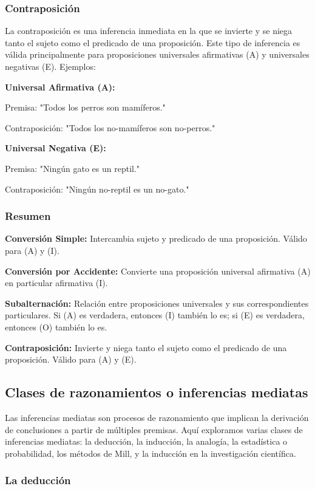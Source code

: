 \subsubsection{Contraposición}
La contraposición es una inferencia inmediata en la que se invierte y se niega tanto el sujeto como el predicado de una proposición. Este tipo de inferencia es válida principalmente para proposiciones universales afirmativas (A) y universales negativas (E). Ejemplos:

\textbf{Universal Afirmativa (A):}

Premisa: "Todos los perros son mamíferos."

Contraposición: "Todos los no-mamíferos son no-perros."

\textbf{Universal Negativa (E):}

Premisa: "Ningún gato es un reptil."

Contraposición: "Ningún no-reptil es un no-gato."

\subsubsection{Resumen}

\textbf{Conversión Simple:} Intercambia sujeto y predicado de una proposición. Válido para (A) y (I).

\textbf{Conversión por Accidente:} Convierte una proposición universal afirmativa (A) en particular afirmativa (I).

\textbf{Subalternación:} Relación entre proposiciones universales y sus correspondientes particulares. Si (A) es verdadera, entonces (I) también lo es; si (E) es verdadera, entonces (O) también lo es.

\textbf{Contraposición:} Invierte y niega tanto el sujeto como el predicado de una proposición. Válido para (A) y (E).

\subsection{Clases de razonamientos o inferencias mediatas}

Las inferencias mediatas son procesos de razonamiento que implican la derivación de conclusiones a partir de múltiples premisas. Aquí exploramos varias clases de inferencias mediatas: la deducción, la inducción, la analogía, la estadística o probabilidad, los métodos de Mill, y la inducción en la investigación científica.

\subsubsection{La deducción}

